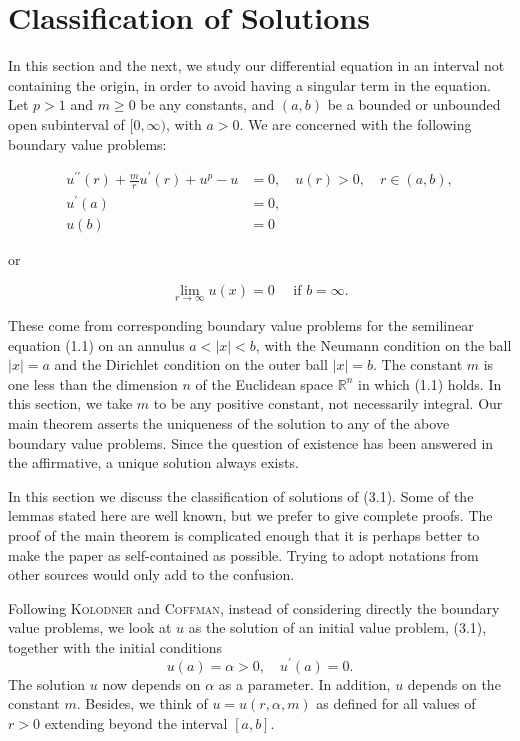 \section{Classification of Solutions}\label{sec:3}

In this section and the next, we study our differential equation in an interval 
not containing the origin, in order to avoid having a singular term in the equation.
Let $p>1$ and $m \geq 0$ be any constants, and $(a, b)$ be a bounded or unbounded 
open subinterval of $[0, \infty)$, with $a>0$. We are concerned with the following
boundary value problems:

\begin{align}
  u^{\prime \prime}(r)+\frac{m}{r} u^{\prime}(r)+u^p-u & =0, \quad u(r)>0,
    \quad r \in(a, b), \label{eq:3.1} \\
  u^{\prime}(a) & = 0, \label{eq:3.2} \\
  u(b) & = 0
\end{align}

or

\begin{equation}\label{eq:3.4}
  \lim _{r \rightarrow \infty} u(x)=0 \quad \text { if } b=\infty .
\end{equation}

These come from corresponding boundary value problems for the semilinear equation 
(1.1) on an annulus $a<|x|<b$, with the Neumann condition on the ball $|x|=a$ and 
the Dirichlet condition on the outer ball $|x|=b$. The constant $m$ is one less 
than the dimension $n$ of the Euclidean space $\mathbb{R}^n$ in which (1.1) holds.
In this section, we take $m$ to be any positive constant, not necessarily integral.
Our main theorem asserts the uniqueness of the solution to any of the above boundary
value problems. Since the question of existence has been answered in the affirmative,
a unique solution always exists.

In this section we discuss the classification of solutions of (3.1). 
Some of the lemmas stated here are well known, but we prefer to give complete proofs.
The proof of the main theorem is complicated enough that it is perhaps better to make
the paper as self-contained as possible. Trying to adopt notations from other sources
would only add to the confusion.

Following \textsc{Kolodner} and \textsc{Coffman}, instead of considering directly the
boundary value problems, we look at $u$ as the solution of an initial value problem, 
(3.1), together with the initial conditions
\begin{equation}\label{eq:3.5}
  u(a)=\alpha>0, \quad u^{\prime}(a)=0.
\end{equation}
The solution $u$ now depends on $\alpha$ as a parameter.
In addition, $u$ depends on the constant $m$. Besides, 
we think of $u=u(r, \alpha, m)$ as defined for all values of $r>0$ 
extending beyond the interval $[a, b]$.


